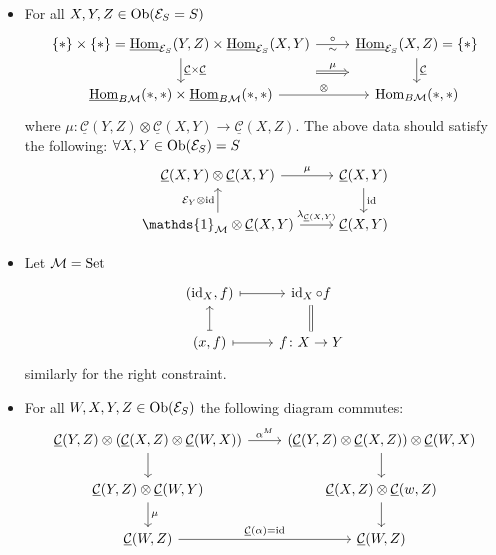 \begin{exmp}
\begin{itemize}
		\item 
		For all $ X , Y , Z \in \operatorname{Ob} ( \mathcal{ E }_S = S ) $
		\[
		\begin{tikzcd}
			\{ * \} \times \{ * \} = \underline{\Hom}_{\mathcal{ E }_S } ( Y , Z ) \times \underline{ \Hom }_{ \mathcal{ E }_S } ( X , Y )
			\ar[r, "\sim"', "\circ"]
			\ar[r,shift right =2em, Rightarrow, "\mu"]
			\ar[d, "\underline{ \mathcal{ C } } \times \underline{ \mathcal{ C } }"]
			&
			\underline{ \Hom }_{ \mathcal{ E }_S }( X , Z ) = \{ * \}
			\ar[d, "\underline{ \mathcal{ C } }"]
			\\
			\underline{ \Hom }_{ B \mathcal{ M } } ( * , * ) \times
			\underline{ \Hom }_{ B \mathcal{ M } } ( * , * )
			\ar[r, "\otimes"]
			&
			\Hom_{B\mathcal{ M } } ( * , * )
		\end{tikzcd}
		\]
		where $ \mu \colon \underline{ \mathcal{ C } }( Y , Z ) \otimes \underline{ \mathcal{ C } } ( X , Y ) \to \underline{ \mathcal{ C } } ( X , Z ) $.
		The above data should satisfy the following:
		$ \forall X , Y \in \operatorname{Ob} ( \mathcal{ E }_S ) = S $ 
		\[
		\begin{tikzcd}
			\underline{ \mathcal{ C } } ( X , Y ) \otimes \underline{ \mathcal{ C } } ( X , Y ) 
			\ar[r, "\mu"]
			&
			\underline{ \mathcal{ C } } ( X , Y )
			\ar[d, " \id "]
			\\
			\mathds{ 1 }_{ \mathcal{ M } } \otimes \underline{ \mathcal{ C } } ( X , Y )
			\ar[r, " \lambda_{ \underline{\mathcal{ C }} ( X , Y )} "]
			\ar[u, " \mathcal{ E }_Y \otimes \id"]
			&
			\underline{ \mathcal{C} }( X , Y )
		\end{tikzcd}
		\]
		
		\item 
		Let $ \mathcal{ M } = \operatorname{Set} $
		\[
		\begin{tikzcd}
			( \id_X , f )
			\ar[r, mapsto]
			&
			\id_X \circ f 
			\ar[d, equal]
			\\
			( x , f )
			\ar[u , mapsto]
			\ar[r, mapsto]
			&
			f \colon X \to Y
		\end{tikzcd}
		\]
		similarly for the right constraint.
		
		\item 
		For all $ W , X , Y , Z \in \operatorname{Ob} ( \mathcal{E }_S ) $ the following diagram commutes:
		\[
		\begin{tikzcd}
			\underline{\mathcal{ C } } ( Y , Z ) \otimes  ( \underline{\mathcal{ C } } ( X , Z ) \otimes \underline{\mathcal{ C } } ( W , X ) )
			\ar[d]
			\ar[r, " \alpha^M " ]
			&
			( \underline{\mathcal{ C } } ( Y , Z ) \otimes   \underline{\mathcal{ C } } ( X , Z ) ) \otimes \underline{\mathcal{ C } } ( W , X ) 
			\ar[d]
			\\
			\underline{ \mathcal{ C } } ( Y , Z ) \otimes 
			\underline{ \mathcal{ C } } ( W , Y )
			\ar[d, " \mu" ]
			&
			\underline{\mathcal{ C } } ( X , Z ) \otimes
			\underline{\mathcal{ C } } ( w , Z )
			\ar[d]
			\\
			\underline{ \mathcal{ C } } ( W , Z )
			\ar[r, " \underline{\mathcal{ C}} ( \alpha ) = \id "]
			&
			\underline{\mathcal{ C } } ( W , Z )
		\end{tikzcd}
		\] 
	\end{itemize}
\end{exmp}

